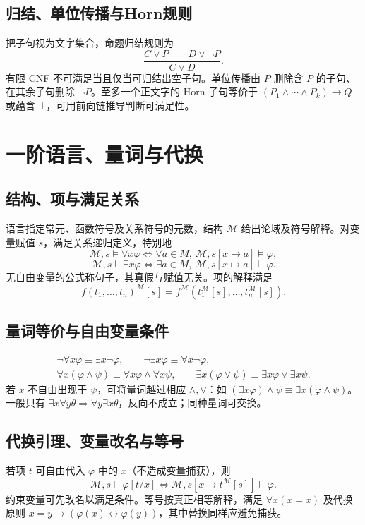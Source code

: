 \documentclass[../main.tex]{subfiles}
\begin{document}
\subsection{归结、单位传播与Horn规则}
把子句视为文字集合，命题归结规则为
\[
\frac{C\lor P\qquad D\lor\neg P}{C\lor D}.
\]
有限 CNF 不可满足当且仅当可归结出空子句。单位传播由 $P$ 删除含 $P$ 的子句、在其余子句删除 $\neg P$。至多一个正文字的 Horn 子句等价于 $(P_1\land\cdots\land P_k)\to Q$ 或蕴含 $\bot$，可用前向链推导判断可满足性。
\section{一阶语言、量词与代换}
\subsection{结构、项与满足关系}
语言指定常元、函数符号及关系符号的元数，结构 $\mathcal M$ 给出论域及符号解释。对变量赋值 $s$，满足关系递归定义，特别地
\[
\mathcal M,s\models\forall x\varphi\iff\forall a\in M,\ \mathcal M,s[x\mapsto a]\models\varphi,
\]
\[
\mathcal M,s\models\exists x\varphi\iff\exists a\in M,\ \mathcal M,s[x\mapsto a]\models\varphi.
\]
无自由变量的公式称句子，其真假与赋值无关。项的解释满足
\[
f(t_1,\ldots,t_n)^{\mathcal M}[s]
=f^{\mathcal M}(t_1^{\mathcal M}[s],\ldots,t_n^{\mathcal M}[s]).
\]
\subsection{量词等价与自由变量条件}
\begin{gather*}
\neg\forall x\varphi\equiv\exists x\neg\varphi,\qquad
\neg\exists x\varphi\equiv\forall x\neg\varphi,\\
\forall x(\varphi\land\psi)\equiv\forall x\varphi\land\forall x\psi,\qquad
\exists x(\varphi\lor\psi)\equiv\exists x\varphi\lor\exists x\psi.
\end{gather*}
若 $x$ 不自由出现于 $\psi$，可将量词越过相应 $\land,\lor$：如 $(\exists x\varphi)\land\psi\equiv\exists x(\varphi\land\psi)$。一般只有 $\exists x\forall y\theta\Rightarrow\forall y\exists x\theta$，反向不成立；同种量词可交换。
\subsection{代换引理、变量改名与等号}
若项 $t$ 可自由代入 $\varphi$ 中的 $x$（不造成变量捕获），则
\[
\mathcal M,s\models\varphi[t/x]
\iff\mathcal M,s[x\mapsto t^{\mathcal M}[s]]\models\varphi.
\]
约束变量可先改名以满足条件。等号按真正相等解释，满足 $\forall x(x=x)$ 及代换原则 $x=y\to(\varphi(x)\leftrightarrow\varphi(y))$，其中替换同样应避免捕获。
\end{document}
